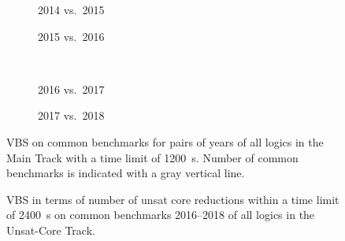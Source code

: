 \documentclass[dvipsnames,table,twoside,11pt]{article}
\newcommand{\maintrack}{Main Track\xspace}
\newcommand{\apptrack}{Application Track\xspace}
\newcommand{\ucoretrack}{Unsat-Core Track\xspace}
\begin{document}
\begin{figure}
  \begin{subfigure}[t]{0.5\textwidth}
    \caption{2014 vs.~2015}
  \end{subfigure}
  \begin{subfigure}[t]{0.5\textwidth}
    \caption{2015 vs.~2016}
  \end{subfigure}
  \\[2ex]
  \begin{subfigure}[t]{0.5\textwidth}
    \caption{2016 vs.~2017}
  \end{subfigure}
  \begin{subfigure}[t]{0.5\textwidth}
    \caption{2017 vs.~2018}
  \end{subfigure}
  \caption{VBS on common benchmarks for pairs of years of all logics
    in the \maintrack with a time limit of \SI{1200}{s}.  Number of
    common benchmarks is indicated with a gray vertical line.}
  \label{fig:progress}
\end{figure}

\begin{figure}
  \centering
  \begin{minipage}{0.47\textwidth}
    \centering
    \vspace{-5ex}
    \caption{VBS in terms of correct \texttt{check-sat} answers (out
      of \num{30370517} total) within a time limit of \SI{2400}{s} on
      common benchmarks 2015--2018 of all logics in the \apptrack.}
    \label{fig:progress-all-app}
  \end{minipage}\hfill
  \begin{minipage}{0.47\textwidth}
    \centering
    \vspace{-5ex}
    \caption{VBS in terms of number of unsat core reductions within a
      time limit of \SI{2400}{s} on common benchmarks 2016--2018 of
      all logics in the \ucoretrack.\\${}$}
    \label{fig:progress-all-uc}
  \end{minipage}
\end{figure}
\end{document}
